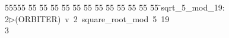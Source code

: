 %
%
\begin{tabbing}
55555 \= 55 \= 55 \= 55 \= 55 \= 55 \= 55 \= 55 \= 55 \= 55 \= 55 \= 55 \= 55 \= \>sqrt\_5\_mod\_19:\\[0pt]
2\>$\triangleright$\>(ORBITER)\ v\ 2\ square\_root\_mod\ 5\ 19\ \\[0pt]
3\>\end{tabbing}
